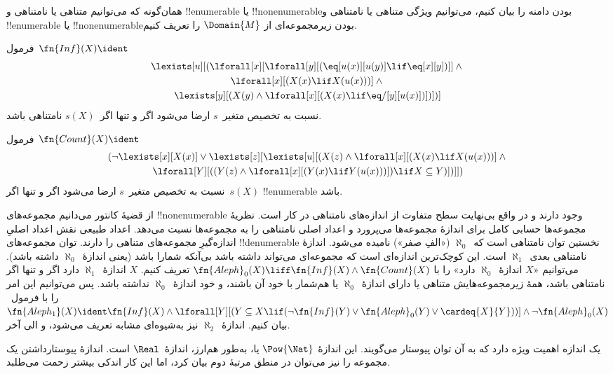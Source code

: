 \documentclass[../../../include/open-logic-section]{subfiles}
\begin{document}


\begin{explain}
همان‌گونه که می‌توانیم متناهی یا نامتناهی و !!{enumerable} یا
!!{nonenumerable}بودن دامنه را بیان کنیم، می‌توانیم ویژگی متناهی یا
نامتناهی و !!{enumerable} یا !!{nonenumerable}بودن زیرمجموعه‌ای از
$\Domain{M}$ را تعریف کنیم.
\end{explain}

\begin{prop}
فرمول~$\fn{Inf}(X) \ident$
\begin{multline*}
\lexists[u][(\lforall[x][\lforall[y][(\eq[u(x)][u(y)] \lif
      \eq[x][y])]] \land {} \\ \lforall[x][(X(x) \lif X(u(x)))]
      \land {} \\ \lexists[y][(X(y) \land \lforall[x][(X(x)
      \lif \eq/[y][u(x)])])])]
\end{multline*}
نسبت به تخصیص متغیر~$s$ ارضا می‌شود اگر و تنها اگر~$s(X)$ نامتناهی
باشد.
\end{prop}

\begin{prop}
فرمول~$\fn{Count}(X) \ident $
\begin{multline*}
(\lnot \lexists[x][X(x)] \lor \lexists[z][\lexists[u][(X(z) \land
    \lforall[x][(X(x) \lif X(u(x)))] \land {} \\ \lforall[Y][((Y(z) \land
      \lforall[x][(Y(x) \lif Y(u(x)))]) \lif X \subseteq Y)])]])
\end{multline*}
نسبت به تخصیص متغیر~$s$ ارضا می‌شود اگر و تنها اگر~$s(X)$
!!{enumerable} باشد.
\end{prop}

از قضیهٔ کانتور می‌دانیم مجموعه‌های !!{nonenumerable} وجود دارند و در
واقع بی‌نهایت سطح متفاوت از اندازه‌های نامتناهی در کار است. نظریهٔ
مجموعه‌ها حسابی کامل برای اندازهٔ مجموعه‌ها می‌پرورد و اعداد اصلی
نامتناهی را به مجموعه‌ها نسبت می‌دهد. اعداد طبیعی نقش اعداد اصلیِ
اندازه‌گیرِ مجموعه‌های متناهی را دارند. توان مجموعه‌های !!{denumerable}
نخستین توان نامتناهی است که~$\aleph_0$ («الفِ صفر») نامیده می‌شود. اندازهٔ
نامتناهی بعدی~$\aleph_1$ است. این کوچک‌ترین اندازه‌ای است که مجموعه‌ای
می‌تواند داشته باشد بی‌آنکه شمارا باشد (یعنی اندازهٔ~$\aleph_0$ داشته
باشد). می‌توانیم «$X$ اندازهٔ~$\aleph_0$ دارد» را با
$\fn{Aleph}_0(X) \liff \fn{Inf}(X) \land \fn{Count}(X)$ تعریف کنیم.
$X$ اندازهٔ~$\aleph_1$ دارد اگر و تنها اگر نامتناهی باشد، همهٔ
  زیرمجموعه‌هایش متناهی یا دارای اندازهٔ~$\aleph_0$ یا هم‌شمار با خود آن
  باشند، و خود اندازهٔ~$\aleph_0$ نداشته باشد. پس می‌توانیم این امر را
با فرمول~$\fn{Aleph_1}(X) \ident \fn{Inf}(X) \land
\lforall[Y][(Y \subseteq X \lif (\lnot\fn{Inf}(Y) \lor
\fn{Aleph}_0(Y) \lor \cardeq{X}{Y}))] \land \lnot
\fn{Aleph}_0(X)$ بیان کنیم. اندازهٔ~$\aleph_2$ نیز به‌شیوه‌ای مشابه
تعریف می‌شود، و الی آخر.

یک اندازه اهمیت ویژه دارد که به آن توان پیوستار می‌گویند. این اندازهٔ
$\Pow{\Nat}$ یا، به‌طور هم‌ارز، اندازهٔ~$\Real$ است. اندازهٔ
پیوستارداشتن یک مجموعه را نیز می‌توان در منطق مرتبهٔ دوم بیان کرد، اما
این کار اندکی بیشتر زحمت می‌طلبد.
\end{document}
